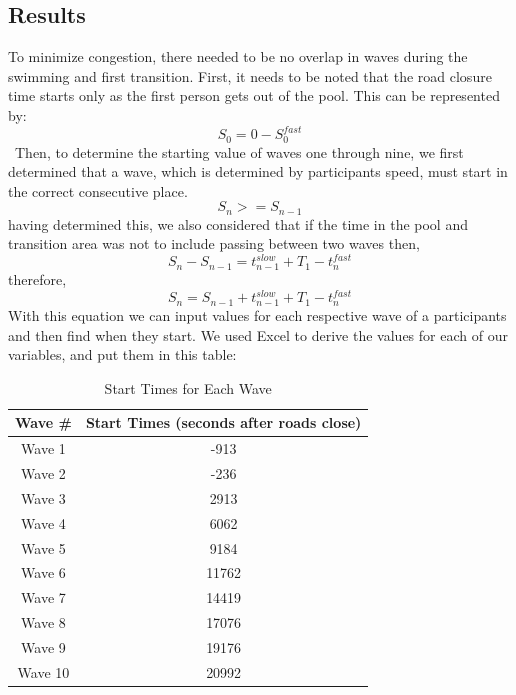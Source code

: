 \documentclass[12pt]{article}
\begin{document}
\subsection{Results}
To minimize congestion, there needed to be no overlap in waves during the swimming and first transition. First, it needs to be noted that the road closure time starts only as the first person gets out of the pool. This can be represented by:
\[S_0 = 0 - S_0^{fast}\]\
Then, to determine the starting value of waves one through nine, we first determined that a wave, which is determined by participants speed, must start in the correct consecutive place.
\[S_{n} >= S_{n-1}\]
having determined this, we also considered that if the time in the pool and transition area was not to include passing between two waves then,
\[S_n - S_{n-1} = t_{n-1}^{slow} + T_1 - t_n^{fast}\]
therefore,
\[S_n = S_{n-1} + t_{n-1}^{slow} + T_1 - t_n^{fast}\]
With this equation we can input values for each respective wave of a participants and then find when they start. We used Excel to derive the values for each of our variables, and put them in this table: \par

\begin{table}[H]
\centering

\label{my-label}
\begin{tabular}{|c|c|}
\hline
Wave \# & Start Times (seconds after roads close) \\\hline
Wave 1  & -913                                    \\\hline
Wave 2  & -236                                    \\\hline
Wave 3  & 2913                                    \\\hline
Wave 4  & 6062                                    \\\hline
Wave 5  & 9184                                    \\\hline
Wave 6  & 11762                                   \\\hline
Wave 7  & 14419                                   \\\hline
Wave 8  & 17076                                   \\\hline
Wave 9  & 19176                                   \\\hline
Wave 10 & 20992                                   \\\hline

\end{tabular}
\caption{Start Times for Each Wave}
\end{table}
\end{document}

